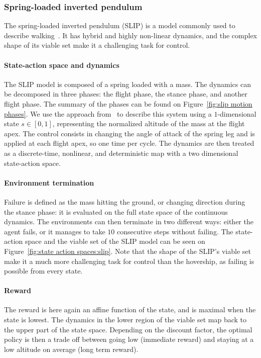 \subsubsection{Spring-loaded inverted pendulum} 
The spring-loaded inverted pendulum (SLIP) is a model commonly used to describe walking~\cite{heim2019beyond}. It has hybrid and highly non-linear dynamics, and the complex shape of its viable set make it a challenging task for control.

\paragraph{State-action space and dynamics} The SLIP model is composed of a spring loaded with a mass. The dynamics can be decomposed in three phases: the flight phase, the stance phase, and another flight phase. The summary of the phases can be found on Figure~\ref{fig:slip motion phases}. We use the approach from~\cite{heim2019beyond} to describe this system using a $1$-dimensional state $s\in[0,1]$, representing the normalized altitude of the mass at the flight apex. The control consists in changing the angle of attack of the spring leg and is applied at each flight apex, so one time per cycle. The dynamics are then treated as a discrete-time, nonlinear, and deterministic map with a two dimensional state-action space.

\paragraph{Environment termination} Failure is defined as the mass hitting the ground, or changing direction during the stance phase: it is evaluated on the full state space of the continuous dynamics. The environments can then terminate in two different ways: either the agent fails, or it manages to take $10$ consecutive steps without failing. The state-action space and the viable set of the SLIP model can be seen on Figure~\ref{fig:state action spaces:slip}. Note that the shape of the SLIP's viable set make it a much more challenging task for control than the hovership, as failing is possible from every state.

\paragraph{Reward} The reward is here again an affine function of the state, and is maximal when the state is lowest. The dynamics in the lower region of the viable set map back to the upper part of the state space. Depending on the discount factor, the optimal policy is then a trade off between going low (immediate reward) and staying at a low altitude on average (long term reward).

